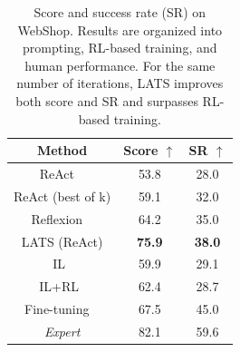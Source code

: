 \begin{table}[t]
  \centering
    \begin{tabular}{c | cc}
    \toprule
    Method & Score $\uparrow$ & SR $\uparrow$ \\
    \midrule
    ReAct {\scriptsize~\citep{yao2023react}} & 53.8 & 28.0 \\
    ReAct (best of k) & 59.1 & 32.0 \\
    Reflexion {\scriptsize~\citep{shinn2023reflexion}} & 64.2 & 35.0 \\
    LATS (ReAct) & \textbf{75.9} & \textbf{38.0} \\
    \midrule
    IL{\scriptsize~\citep{yao2022webshop}} & 59.9 & 29.1 \\
    IL+RL{\scriptsize~\citep{yao2022webshop}} & 62.4 & 28.7 \\
    Fine-tuning {\scriptsize~\citep{furuta2023multimodal}} & 67.5 & 45.0 \\
    \midrule
    \textit{Expert} & 82.1 & 59.6 \\
    \bottomrule
    \end{tabular}
    \caption{
      Score and success rate (SR) on WebShop. Results are organized into prompting, RL-based training, and human performance. For the same number of iterations, LATS improves both score and SR and surpasses RL-based training.
    }
    \label{table:webshop}
\end{table}
